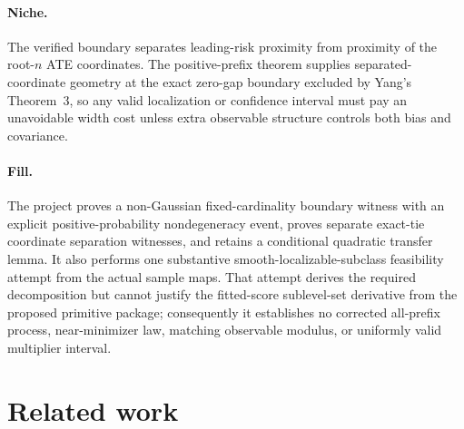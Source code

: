 \documentclass{article}
\begin{document}
\paragraph{Niche.} The verified boundary separates leading-risk proximity from proximity of the root-\(n\) ATE coordinates.  The positive-prefix theorem supplies separated-coordinate geometry at the exact zero-gap boundary excluded by Yang's Theorem~3, so any valid localization or confidence interval must pay an unavoidable width cost unless extra observable structure controls both bias and covariance.

\paragraph{Fill.} The project proves a non-Gaussian fixed-cardinality boundary witness with an explicit positive-probability nondegeneracy event, proves separate exact-tie coordinate separation witnesses, and retains a conditional quadratic transfer lemma.  It also performs one substantive smooth-localizable-subclass feasibility attempt from the actual sample maps.  That attempt derives the required decomposition but cannot justify the fitted-score sublevel-set derivative from the proposed primitive package; consequently it establishes no corrected all-prefix process, near-minimizer law, matching observable modulus, or uniformly valid multiplier interval.

\section{Related work}
\end{document}
